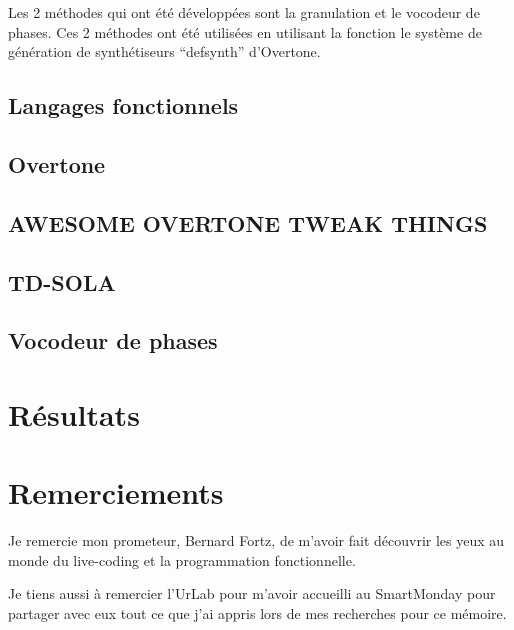 \documentclass[letterpaper]{article}
\begin{document}
Les 2 méthodes qui ont été développées sont la granulation et le vocodeur de phases.
Ces 2 méthodes ont été utilisées en utilisant la fonction le système de génération de
synthétiseurs ``defsynth'' d'Overtone.

\subsection{Langages fonctionnels}

\subsection{Overtone}

\subsection{AWESOME OVERTONE TWEAK THINGS}
\subsection{TD-SOLA}
\subsection{Vocodeur de phases}


\section{Résultats}

\section{Remerciements}
  Je remercie mon prometeur, Bernard Fortz, de m'avoir fait découvrir
  les yeux au monde du live-coding et la programmation fonctionnelle.

  Je tiens aussi à remercier l'UrLab pour m'avoir accueilli au SmartMonday
  pour partager avec eux tout ce que j'ai appris lors de mes recherches
  pour ce mémoire.

\footnotesize


\end{document}
